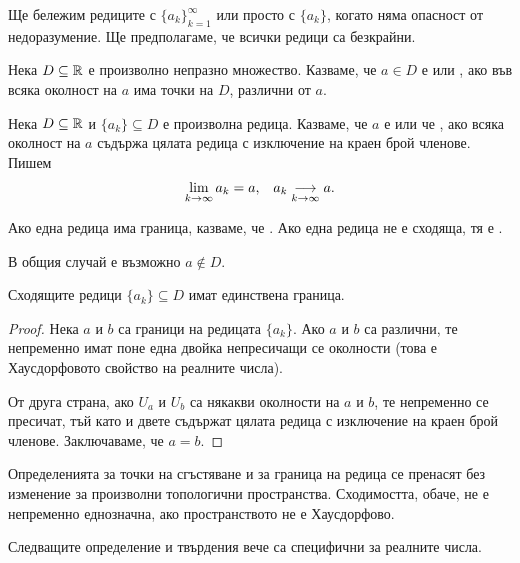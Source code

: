 \documentclass[numbers=endperiod, bibliography=totocnumbered]{scrartcl}
\begin{document}
Ще бележим редиците с \( {\{ a_k \}}_{k=1}^\infty \) или просто с \( \{ a_k \} \), когато няма опасност от недоразумение. Ще предполагаме, че всички редици са безкрайни.

\begin{definition}
  Нека \( D \subseteq \R \) е произволно непразно множество. Казваме, че \( a \in D \) е  или , ако във всяка околност на \( a \) има точки на \( D \), различни от \( a \).
\end{definition}

\begin{definition}
  Нека \( D \subseteq \R \) и \( \{ a_k \} \subseteq D \) е произволна редица. Казваме, че \( a \) е  или че , ако всяка околност на \( a \) съдържа цялата редица с изключение на краен брой членове. Пишем
  \begin{align*}
    \lim_{k \to \infty} a_k = a,
    &&
    a_k \Conv[k \to \infty]{} a.
  \end{align*}

  Ако една редица има граница, казваме, че . Ако една редица не е сходяща, тя е .
\end{definition}
\begin{note}
  В общия случай е възможно \( a \not\in D \).
\end{note}

\begin{proposition}
  Сходящите редици \( \{ a_k \} \subseteq D \) имат единствена граница.
\end{proposition}
\begin{proof}
  Нека \( a \) и \( b \) са граници на редицата \( \{ a_k \} \). Ако \( a \) и \( b \) са различни, те непременно имат поне една двойка непресичащи се околности (това е Хаусдорфовото свойство на реалните числа).

  От друга страна, ако \( U_a \) и \( U_b \) са някакви околности на \( a \) и \( b \), те непременно се пресичат, тъй като и двете съдържат цялата редица с изключение на краен брой членове. Заключаваме, че \( a = b \).
\end{proof}

\begin{note}
  Определенията за точки на сгъстяване и за граница на редица се пренасят без изменение за произволни топологични пространства. Сходимостта, обаче, не е непременно еднозначна, ако пространството не е Хаусдорфово.

  Следващите определение и твърдения вече са специфични за реалните числа.
\end{note}
\end{document}
